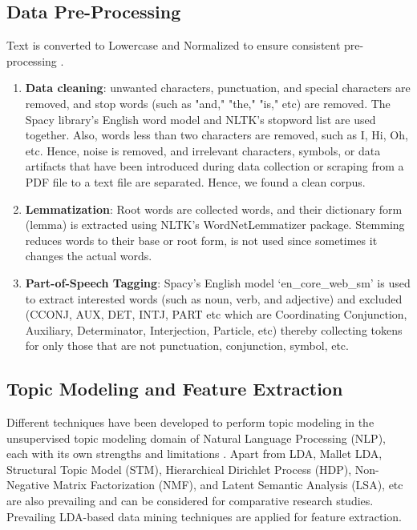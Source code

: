\documentclass[sn-mathphys,Numbered]{sn-jnl}%
\theoremstyle{thmstyleone}%
\theoremstyle{thmstyletwo}%
\theoremstyle{thmstylethree}%
\begin{document}
\subsection{Data Pre-Processing}\label{data_pre} 
Text is converted to Lowercase and Normalized to ensure consistent pre-processing \cite{kao_natural_2007}. \begin{enumerate}[label=(\roman*)] \item \textbf{Data cleaning}: unwanted characters, punctuation, and special characters are removed, and stop words (such as "and," "the," "is," etc) are removed. The Spacy library's English word model and NLTK's stopword list are used together. Also, words less than two characters are removed, such as I, Hi, Oh, etc. Hence, noise is removed, and irrelevant characters, symbols, or data artifacts that have been introduced during data collection or scraping from a PDF file to a text file are separated. Hence, we found a clean corpus. \item \textbf{Lemmatization}: Root words are collected words, and their dictionary form (lemma) is extracted using NLTK's WordNetLemmatizer package. Stemming reduces words to their base or root form, is not used since sometimes it changes the actual words. \item \textbf{Part-of-Speech Tagging}: Spacy's English model `en\_core\_web\_sm' is used to extract interested words (such as noun, verb, and adjective) and excluded (CCONJ, AUX, DET, INTJ, PART etc which are Coordinating Conjunction, Auxiliary, Determinator, Interjection, Particle, etc) thereby collecting tokens for only those that are not punctuation, conjunction, symbol, etc. \end{enumerate} \subsection{Topic Modeling and Feature Extraction}\label{top_mod_feature} Different techniques have been developed to perform topic modeling in the unsupervised topic modeling domain of Natural Language Processing (NLP), each with its own strengths and limitations \cite{vayansky2020review, abdelrazek2022topic, yi2009comparative}. Apart from LDA, Mallet LDA, Structural Topic Model (STM), Hierarchical Dirichlet Process (HDP), Non-Negative Matrix Factorization (NMF), and Latent Semantic Analysis (LSA), etc are also prevailing and can be considered for comparative research studies. Prevailing LDA-based data mining techniques are applied for feature extraction.\\ 
\end{document}
